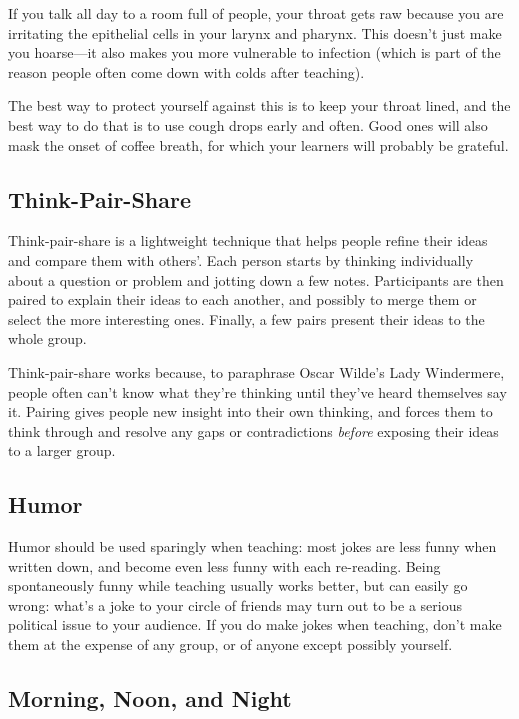 If you talk all day to a room full of people, your throat gets raw
because you are irritating the epithelial cells in your larynx and
pharynx. This doesn't just make you hoarse---it also makes you more
vulnerable to infection (which is part of the reason people often come
down with colds after teaching).

The best way to protect yourself against this is to keep your throat
lined, and the best way to do that is to use cough drops early and
often. Good ones will also mask the onset of coffee breath, for which
your learners will probably be grateful.

\subsection*{Think-Pair-Share}

Think-pair-share is a lightweight technique that helps people refine
their ideas and compare them with others'. Each person starts by
thinking individually about a question or problem and jotting down a
few notes.  Participants are then paired to explain their ideas to
each another, and possibly to merge them or select the more
interesting ones. Finally, a few pairs present their ideas to the
whole group.

Think-pair-share works because, to paraphrase Oscar Wilde's Lady
Windermere, people often can't know what they're thinking until
they've heard themselves say it. Pairing gives people new insight into
their own thinking, and forces them to think through and resolve any
gaps or contradictions \emph{before} exposing their ideas to a larger
group.

\subsection*{Humor}

Humor should be used sparingly when teaching: most jokes are less
funny when written down, and become even less funny with each
re-reading.  Being spontaneously funny while teaching usually works
better, but can easily go wrong: what's a joke to your circle of
friends may turn out to be a serious political issue to your
audience. If you do make jokes when teaching, don't make them at the
expense of any group, or of anyone except possibly yourself.

\subsection*{Morning, Noon, and Night}

